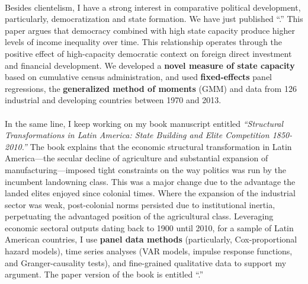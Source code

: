 \documentclass[letterpaper]{article}
\begin{document}
\paragraph{}Besides clientelism, I have a strong interest in comparative political development, particularly, democratization and state formation. We have just published ``\href{https://doi.org/10.1016/j.ejpoleco.2021.102048}{}.'' This paper argues that democracy combined with high state capacity produce higher levels of income inequality over time. This relationship operates through the positive effect of high-capacity democratic context on foreign direct investment and financial development. We developed a {\bf novel measure of state capacity} based on cumulative census administration, and used {\bf fixed-effects} panel regressions, the {\bf generalized method of moments} (GMM) and data from 126 industrial and developing countries between 1970 and 2013. 

\paragraph{}In the same line, I keep working on my book manuscript entitled \emph{``Structural Transformations in Latin America: State Building and Elite Competition 1850-2010.''} The book explains that the economic structural transformation in Latin America---the secular decline of agriculture and substantial expansion of manufacturing---imposed tight constraints on the way politics was run by the incumbent landowning class. This was a major change due to the advantage the landed elites enjoyed since colonial times. Where the expansion of the industrial sector was weak, post-colonial norms persisted due to institutional inertia, perpetuating the advantaged position of the agricultural class. Leveraging economic sectoral outputs dating back to 1900 until 2010, for a sample of Latin American countries, I use {\bf panel data methods} (particularly, Cox-proportional hazard models), time series analyses (VAR models, impulse response functions, and Granger-causality tests), and fine-grained qualitative data to support my argument. The paper version of the book is entitled ``\href{https://github.com/hbahamonde/Earthquake_Paper/raw/master/Bahamonde_Earthquake_Paper.pdf}{{\unskip}}.''
\end{document}
